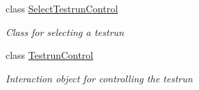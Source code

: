 \begin{DoxyCompactItemize}
class \hyperlink{class_web_analyzer_1_1_u_i_1_1_interaction_objects_1_1_select_testrun_control}{Select\+Testrun\+Control}
\begin{DoxyCompactList}\small\item\em Class for selecting a testrun \end{DoxyCompactList}\item 
class \hyperlink{class_web_analyzer_1_1_u_i_1_1_interaction_objects_1_1_testrun_control}{Testrun\+Control}
\begin{DoxyCompactList}\small\item\em Interaction object for controlling the testrun \end{DoxyCompactList}\end{DoxyCompactItemize}
